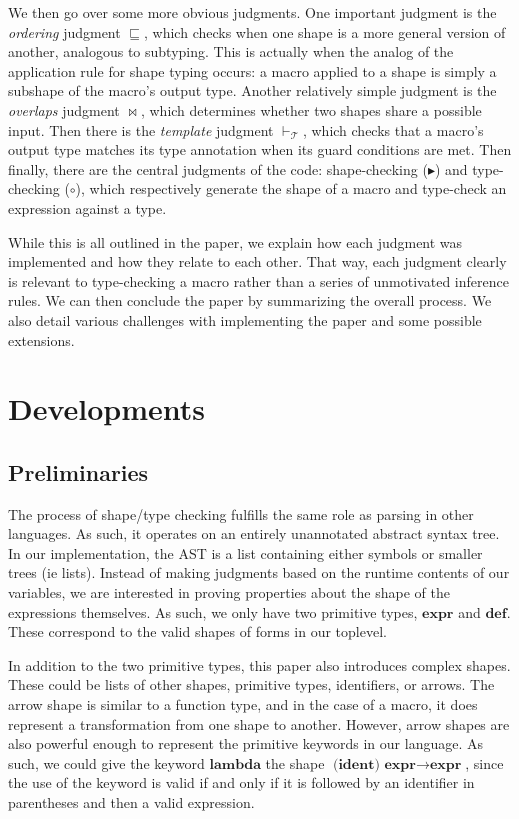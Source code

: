 \documentclass[11pt]{article}
\begin{document}
We then go over some more obvious judgments. One important judgment is the \textit{ordering} judgment $\sqsubseteq$, which checks when one shape is a more general version of another, analogous to subtyping. This is actually when the analog of the application rule for shape typing occurs: a macro applied to a shape is simply a subshape of the macro's output type. Another relatively simple judgment is the \textit{overlaps} judgment $\bowtie$, which determines whether two shapes share a possible input. Then there is the \textit{template} judgment $\vdash_{\mathcal T}$, which checks that a macro's output type matches its type annotation when its guard conditions are met. Then finally, there are the central judgments of the code: shape-checking ($\blacktriangleright$) and type-checking ($\circ$), which respectively generate the shape of a macro and type-check an expression against a type.\par

While this is all outlined in the paper, we explain how each judgment was implemented and how they relate to each other. That way, each judgment clearly is relevant to type-checking a macro rather than a series of unmotivated inference rules. We can then conclude the paper by summarizing the overall process. We also detail various challenges with implementing the paper and some possible extensions.

\section{Developments}


\subsection{Preliminaries}

The process of shape/type checking fulfills the same role as parsing in other languages. As such, it operates on an entirely unannotated abstract syntax tree. In our implementation, the AST is a list containing either symbols or smaller trees (ie lists). Instead of making judgments based on the runtime contents of our variables, we are interested in proving properties about the shape of the expressions themselves. As such, we only have two primitive types, $\textbf{expr}$ and $\textbf{def}$. These correspond to the valid shapes of forms in our toplevel.

In addition to the two primitive types, this paper also introduces complex shapes. These could be lists of other shapes, primitive types, identifiers, or arrows. The arrow shape is similar to a function type, and in the case of a macro, it does represent a transformation from one shape to another. However, arrow shapes are also powerful enough to represent the primitive keywords in our language. As such, we could give the keyword $\textbf{lambda}$ the shape $\textbf{(ident) expr} \rightarrow \textbf{expr}$, since the use of the keyword is valid if and only if it is followed by an identifier in parentheses and then a valid expression.
\end{document}
